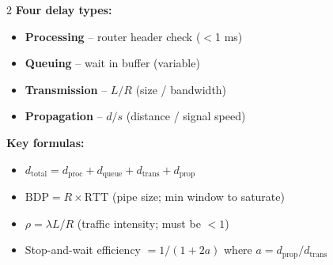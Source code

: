 \documentclass[11pt, letterpaper]{article}
\begin{document}
\vspace{4pt}

\begin{tcolorbox}[colback=part5bg, colframe=sectionteal,
  title={\bfseries Delay, Throughput \& Key Formulas}, arc=3pt, boxrule=1pt]
\footnotesize
\begin{multicols}{2}
\textbf{Four delay types:}
\begin{itemize}[noitemsep, leftmargin=*]
  \item \textbf{Processing} -- router header check ($<$1 ms)
  \item \textbf{Queuing} -- wait in buffer (variable)
  \item \textbf{Transmission} -- $L/R$ (size / bandwidth)
  \item \textbf{Propagation} -- $d/s$ (distance / signal speed)
\end{itemize}
\columnbreak
\textbf{Key formulas:}
\begin{itemize}[noitemsep, leftmargin=*]
  \item $d_{\text{total}} = d_{\text{proc}} + d_{\text{queue}} + d_{\text{trans}} + d_{\text{prop}}$
  \item $\text{BDP} = R \times \text{RTT}$ (pipe size; min window to saturate)
  \item $\rho = \lambda L / R$ (traffic intensity; must be $< 1$)
  \item Stop-and-wait efficiency $= 1/(1+2a)$ where $a = d_{\text{prop}}/d_{\text{trans}}$
\end{itemize}
\end{multicols}
\end{tcolorbox}

\vspace{4pt}
\end{document}
